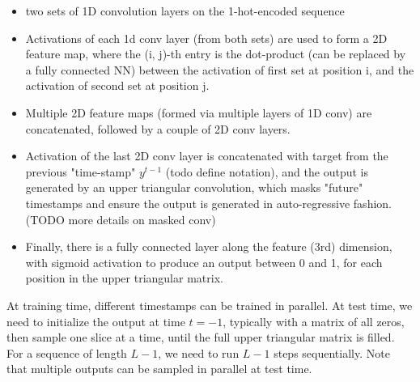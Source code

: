 \documentclass{article}
\begin{document}
\begin{itemize}

    \item two sets of 1D convolution layers on the 1-hot-encoded sequence

    \item Activations of each 1d conv layer (from both sets) are used to form a 2D feature map,
where the (i, j)-th entry is the dot-product (can be replaced by a fully connected NN) between the
activation of first set at position i, and the activation of second set at position j.

    \item Multiple 2D feature maps (formed via multiple layers of 1D conv) are concatenated,
followed by a couple of 2D conv layers.

    \item  Activation of the last 2D conv layer is concatenated with target from the previous "time-stamp" $y^{t-1}$ (todo define notation),
and the output is generated by an upper triangular convolution,
which masks "future" timestamps and ensure the output is generated in auto-regressive fashion. (TODO more details on masked conv)

    \item Finally, there is a fully connected layer along the feature (3rd) dimension,
   with sigmoid activation to produce an output between 0 and 1,
    for each position in the upper triangular matrix.

\end{itemize}

At training time, different timestamps can be trained in parallel.
At test time, we need to initialize the output at time $t=-1$, typically with a matrix of all zeros,
then sample one slice at a time, until the full upper triangular matrix is filled.
For a sequence of length $L-1$, we need to run $L-1$ steps sequentially.
Note that multiple outputs can be sampled in parallel at test time.


%
\end{document}

